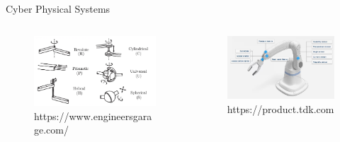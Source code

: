 \documentclass[11pt,t,usepdftitle=false,aspectratio=169]{beamer}
\begin{document}
\begin{frame}{Cyber Physical Systems}
   \begin{columns}
      \begin{column}{.455\textwidth}
         \begin{figure}            
            \includegraphics{images/actuation.png}
            \caption{https://www.engineersgarage.com/} %
         \end{figure}
      \end{column}
      \begin{column}{.455\textwidth}  
         \begin{figure}
            \includegraphics{images/sensor.png}
            \caption{https://product.tdk.com} %
         \end{figure}
      \end{column}
   \end{columns}
\end{frame}
\end{document}
